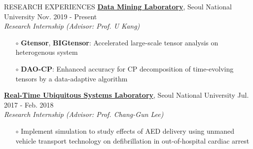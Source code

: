 \documentclass[10pt]{resume} %
\begin{document}

\begin{rSection}{RESEARCH EXPERIENCES}
\href{https://datalab.snu.ac.kr/}{\textbf{Data Mining Laboratory}}, Seoul National University \hfill Nov. 2019 - Present \\
\textit{Research Internship (Advisor: Prof. U Kang)}
\vspace{-1mm}
\begin{itemize}
  \item[$\circ$] \textbf{Gtensor}, \textbf{BIGtensor}: Accelerated large-scale tensor analysis on heterogenous system \vspace{-1mm}
  \item[$\circ$] \textbf{DAO-CP}: Enhanced accuracy for CP decomposition of time-evolving tensors by a data-adaptive algorithm
\end{itemize}
\href{https://rubis.snu.ac.kr/}{\textbf{Real-Time Ubiquitous Systems Laboratory}}, Seoul National University \hfill Jul. 2017 - Feb. 2018 \\
\textit{Research Internship (Advisor: Prof. Chang-Gun Lee)}
\vspace{-1mm}
\begin{itemize}
  \item[$\circ$] Implement simulation to study effects of AED delivery using unmaned vehicle transport technology on defibrillation in out-of-hospital cardiac arrest
\end{itemize}
\end{rSection}



\end{document}
